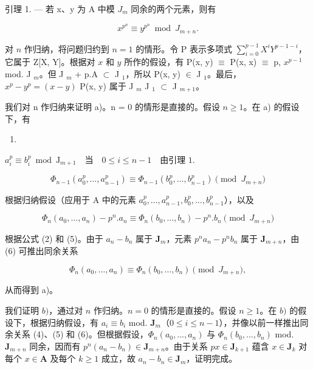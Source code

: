 引理 1. --- 若 x、y 为 A 中模 \(J_{m}\) 同余的两个元素，则有

\[
x ^ {p ^ {n}} \equiv y ^ {p ^ {n}} \bmod J _ {m + n}.
\]

对 \(n\) 作归纳，将问题归约到 \(n=1\) 的情形。令 P 表示多项式 \(\sum_{i=0}^{p-1} X^i Y^{p-1-i}\)，它属于 Z{[}X, Y{]}。根据对 \(x\) 和 \(y\) 所作的假设，有 P(x, y) \(\equiv\) P(x, x) \(\equiv\) p, \(x^{p-1}\) mod. J \(_m\)。但 J \(_m\) + p.A \(\subset\) J \(_1\)，所以 P(x, y) \(\in\) J \(_1\)。最后，\(x^p - y^p = (x - y)\) P(x, y) 属于 J \(_m\) J \(_1\) \(\subset\) J \(_{m+1}\)。

我们对 n 作归纳来证明 a)。n = 0 的情形是直接的。假设 \(n \geqslant 1\)。在 a) 的假设下，有

\begin{enumerate}
\def\labelenumi{(\arabic{enumi})}
\setcounter{enumi}{3}
\tightlist
\item
\end{enumerate}

\(a_{i}^{p}\equiv b_{i}^{p}\bmod \mathrm{J}_{m + 1}\quad \text{当}\quad 0\leqslant i\leqslant n - 1\quad \text{由引理 } 1.\)

\[
\Phi_ {n - 1} (a _ {0} ^ {p}, \dots , a _ {n - 1} ^ {p}) \equiv \Phi_ {n - 1} (b _ {0} ^ {p}, \dots , b _ {n - 1} ^ {p}) \pmod{J _ {m + n}}\tag{5}
\]

根据归纳假设（应用于 A 中的元素 \(a_0^p, \ldots, a_{n-1}^p, b_0^p, \ldots, b_{n-1}^p\)），以及

\[
\Phi_ {n} (a _ {0},..., a _ {n}) - p ^ {n}. a _ {n} \equiv \Phi_ {n} (b _ {0},..., b _ {n}) - p ^ {n}. b _ {n} \pmod{J _ {m + n}}\tag{6}
\]

根据公式 (2) 和 (5)。由于 \(a_{n}-b_{n}\) 属于 \(\mathbf{J}_{m}\)，元素 \(p^{n}a_{n}-p^{n}b_{n}\) 属于 \(\mathbf{J}_{m+n}\)，由 (6) 可推出同余关系

\[
\Phi_ {n} (a _ {0}, \dots , a _ {n}) \equiv \Phi_ {n} (b _ {0}, \dots , b _ {n}) \pmod{J _ {m + n}},
\]

从而得到 a)。

  我们证明 \(b)\)，通过对 \(n\) 作归纳。\(n=0\) 的情形是直接的。假设 \(n\geqslant1\)。在 \(b)\) 的假设下，根据归纳假设，有 \(a_{i}\equiv b_{i}\) mod. \(\mathbf{J}_{m}\)（\(0\leqslant i\leqslant n-1\)），并像以前一样推出同余关系 (4)、(5) 和 (6)。但根据假设，\(\Phi_{n}(a_{0},...,a_{n})\) 与 \(\Phi_{n}(b_{0},...,b_{n})\) mod. \(\mathbf{J}_{m+n}\) 同余，因而有 \(p^{n}(a_{n}-b_{n})\in\mathbf{J}_{m+n}\)。由于关系 \(p x\in\mathbf{J}_{k+1}\) 蕴含 \(x\in\mathbf{J}_{k}\) 对每个 \(x\in\mathbf{A}\) 及每个 \(k\geqslant1\) 成立，故 \(a_{n}-b_{n}\in\mathbf{J}_{m}\)，证明完成。

